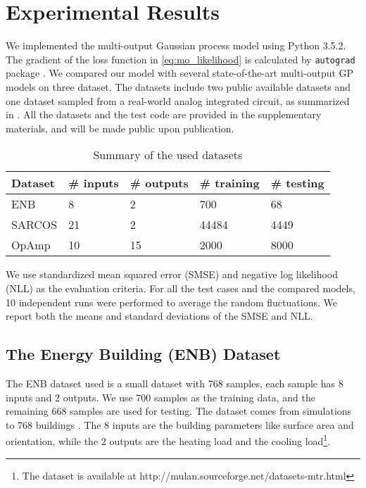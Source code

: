 \section{Experimental Results}\label{sec:experiments}


We implemented the multi-output Gaussian process model using Python 3.5.2. The gradient of the loss function in \eqref{eq:mo_likelihood} is calculated by \texttt{autograd} package \cite{maclaurin2015autograd}. We compared our model with several state-of-the-art multi-output GP models on three dataset. The datasets include two public available datasets and one dataset sampled from a real-world analog integrated circuit, as summarized in . All the datasets and the test code are provided in the supplementary materials, and will be made public upon publication.

\begin{table}[!htb]
    \centering
    \caption{Summary of the used datasets}
    \label{tab:datasets}
    \begin{tabular}{lllll}
        \toprule
        Dataset & \# inputs & \# outputs & \# training & \# testing \\ \midrule
        ENB    & 8         & 2          & 700         & 68  \\
        SARCOS & 21        & 2          & 44484       & 4449 \\
        OpAmp  & 10        & 15         & 2000        & 8000 \\
        \bottomrule
    \end{tabular}
\end{table}
We use standardized mean squared error (SMSE) and negative log likelihood (NLL) as the evaluation criteria. For all the test cases and the compared models, 10 independent runs were performed to average the random fluctuations. We report both the means and standard deviations of the SMSE and NLL.

\subsection{The Energy Building (ENB) Dataset}\label{sec:enb}

The ENB dataset used is a small dataset with 768 samples, each sample has 8 inputs and 2 outputs. We use 700 samples as the training data, and the remaining 668 samples are used for testing. The dataset comes from simulations to 768 buildings \cite{spyromitros2016multi, tsanas2012accurate}. The 8 inputs are the building parameters like surface area and orientation, while the 2 outputs are the heating load and the cooling load\footnote{The dataset is available at http://mulan.sourceforge.net/datasets-mtr.html}.

